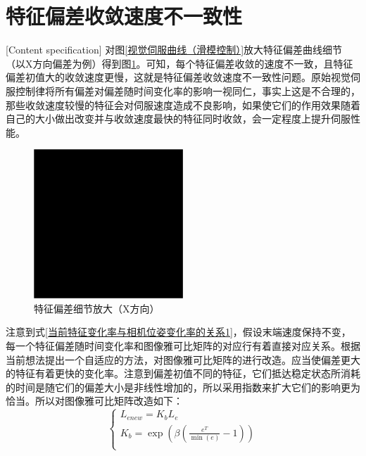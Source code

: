 \documentclass[fontset=fandol,type=bachelor,campus=harbin,bsmainpagenumberline=true]{hithesisbook}
\begin{document}
\section{特征偏差收敛速度不一致性}[Content specification]
对图\ref{视觉伺服曲线（滑模控制）}放大特征偏差曲线细节（以X方向偏差为例）得到图\ref{特征偏差细节放大（X方向）}。可知，每个特征偏差收敛的速度不一致，且特征偏差初值大的收敛速度更慢，这就是特征偏差收敛速度不一致性问题。原始视觉伺服控制律将所有偏差对偏差随时间变化率的影响一视同仁，事实上这是不合理的，那些收敛速度较慢的特征会对伺服速度造成不良影响，如果使它们的作用效果随着自己的大小做出改变并与收敛速度最快的特征同时收敛，会一定程度上提升伺服性能。
\begin{figure}[h]
	\centering
	\includegraphics[width=0.5\textwidth]{chapter5/替身}
	\caption{特征偏差细节放大（X方向）}
	\label{特征偏差细节放大（X方向）}
\end{figure}


注意到式\ref{当前特征变化率与相机位姿变化率的关系1}，假设末端速度保持不变，每一个特征偏差随时间变化率和图像雅可比矩阵的对应行有着直接对应关系。根据当前想法提出一个自适应的方法，对图像雅可比矩阵的进行改造。应当使偏差更大的特征有着更快的变化率。注意到偏差初值不同的特征，它们抵达稳定状态所消耗的时间是随它们的偏差大小是非线性增加的，所以采用指数来扩大它们的影响更为恰当。所以对图像雅可比矩阵改造如下：
\begin{equation}
\left\{ \begin{array}{c}
	L_{enew}=K_bL_e\\
	K_b=\exp \left( \beta \left( \frac{e^T}{\min \left( e \right)}-1 \right) \right)\\
\end{array} \right.
\label{特征偏差收敛速度不一致性}
\end{equation}
\end{document}
